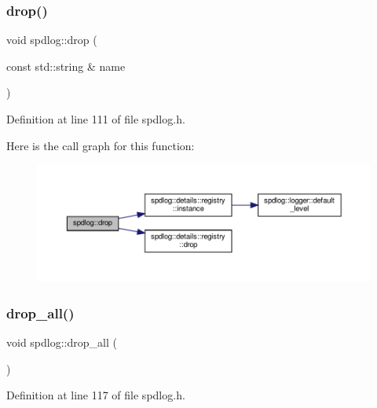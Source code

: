 \subsubsection{\texorpdfstring{drop()}{drop()}}
{\footnotesize\ttfamily void spdlog\+::drop (\begin{DoxyParamCaption}\item[{const std\+::string \&}]{name }\end{DoxyParamCaption})\hspace{0.3cm}{\ttfamily [inline]}}



Definition at line 111 of file spdlog.\+h.

Here is the call graph for this function\+:
\nopagebreak
\begin{figure}[H]
\begin{center}
\leavevmode
\includegraphics[width=350pt]{namespacespdlog_af2ec5792fb30798cf285da36cb5c9377_cgraph}
\end{center}
\end{figure}
\mbox{\label{namespacespdlog_ab1211636fc47637f4dc5ee9a18aa1bce}} 
\subsubsection{\texorpdfstring{drop\+\_\+all()}{drop\_all()}}
{\footnotesize\ttfamily void spdlog\+::drop\+\_\+all (\begin{DoxyParamCaption}{ }\end{DoxyParamCaption})\hspace{0.3cm}{\ttfamily [inline]}}



Definition at line 117 of file spdlog.\+h.

